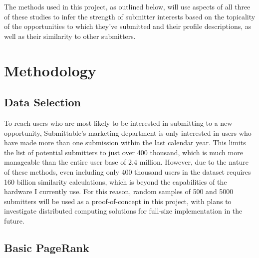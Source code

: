 \documentclass[]{report}   %
\begin{document}
The methods used in this project, as outlined below, will use aspects of all three of these studies to infer the strength of submitter interests based on the topicality of the opportunities to which they've submitted and their profile descriptions, as well as their similarity to other submitters.


\chapter{Methodology}

\section{Data Selection}

To reach users who are most likely to be interested in submitting to a new opportunity, Submittable's marketing department is only interested in users who have made more than one submission within the last calendar year. This limits the list of potential submitters to just over 400 thousand, which is much more manageable than the entire user base of 2.4 million. However, due to the nature of these methods, even including only 400 thousand users in the dataset requires 160 billion similarity calculations, which is beyond the capabilities of the hardware I currently use. For this reason, random samples of 500 and 5000 submitters will be used as a proof-of-concept in this project, with plans to investigate distributed computing solutions for full-size implementation in the future.

\section{Basic PageRank}
\end{document}
